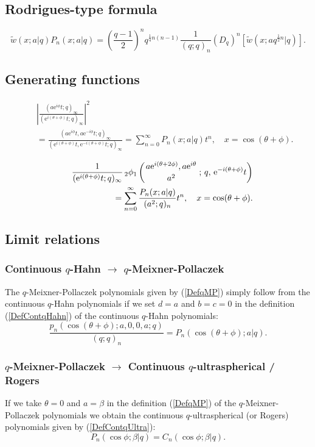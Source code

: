 \documentclass[envcountchap,graybox]{svmono}
\newcounter{rom}
\newcommand{\qhyp}[5]{\mbox{}_{#1}{\phi}_{#2}
\left(\genfrac{}{}{0pt}{}{#3}{#4}\,;\,q,\,#5\right)}
\newcommand{\e}{\textrm{e}}
\begin{document}
\subsection*{Rodrigues-type formula}
\begin{equation}
\label{RodqMP}
{\tilde w}(x;a|q)P_n(x;a|q)=\left(\frac{q-1}{2}\right)^n
q^{\frac{1}{4}n(n-1)}\frac{1}{(q;q)_n}\left(D_q\right)^n\left[{\tilde w}(x;aq^{\frac{1}{2}n}|q)\right].
\end{equation}

\subsection*{Generating functions}
\begin{eqnarray}
\label{GenqMP1}
& &\left|\frac{(a\e^{i\phi}t;q)_{\infty}}{(\e^{i(\theta+\phi)}t;q)_{\infty}}\right|^2\nonumber\\
& &{}=\frac{(a\e^{i\phi}t,a\e^{-i\phi}t;q)_{\infty}}{(\e^{i(\theta+\phi)}t,\e^{-i(\theta+\phi)}t;q)_{\infty}}
=\sum_{n=0}^{\infty}P_n(x;a|q)t^n,\quad x=\cos(\theta+\phi).
\end{eqnarray}

\begin{eqnarray}
\label{GenqMP2}
& &\frac{1}{(\e^{i(\theta+\phi)}t;q)_{\infty}}\,
\qhyp{2}{1}{a\e^{i(\theta+2\phi)},a\e^{i\theta}}{a^2}{\e^{-i(\theta+\phi)}t}\nonumber\\
& &{}=\sum_{n=0}^{\infty}\frac{P_n(x;a|q)}{(a^2;q)_n}t^n,\quad x=\cos(\theta+\phi).
\end{eqnarray}

\subsection*{Limit relations}

\subsubsection*{Continuous $q$-Hahn $\rightarrow$ $q$-Meixner-Pollaczek}
The $q$-Meixner-Pollaczek polynomials given by (\ref{DefqMP}) simply follow
from the continuous $q$-Hahn polynomials if we set $d=a$ and $b=c=0$ in the
definition (\ref{DefContqHahn}) of the continuous $q$-Hahn polynomials:
$$\frac{p_n(\cos(\theta+\phi);a,0,0,a;q)}{(q;q)_n}=P_n(\cos(\theta+\phi);a|q).$$

\subsubsection*{$q$-Meixner-Pollaczek $\rightarrow$ Continuous $q$-ultraspherical /
Rogers}
If we take $\theta=0$ and $a=\beta$ in the definition (\ref{DefqMP}) of the
$q$-Meixner-Pollaczek polynomials we obtain the continuous
$q$-ultraspherical (or Rogers) polynomials given by (\ref{DefContqUltra}):
\begin{equation}
P_n(\cos\phi;\beta|q)=C_n(\cos\phi;\beta|q).
\end{equation}
\end{document}
